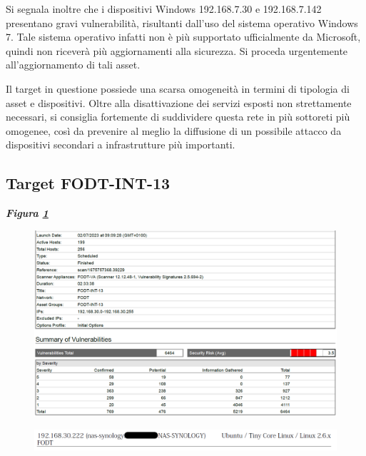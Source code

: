 \documentclass[target=bach,aauheader=]{thud}
\begin{document}
Si segnala inoltre che i dispositivi Windows 192.168.7.30 e 192.168.7.142 presentano gravi vulnerabilità, risultanti dall’uso del sistema operativo Windows 7. Tale sistema operativo infatti non è più supportato ufficialmente da Microsoft, quindi non riceverà più aggiornamenti alla sicurezza. Si proceda urgentemente all’aggiornamento di tali asset.

Il target in questione possiede una scarsa omogeneità in termini di tipologia di asset e dispositivi. Oltre alla disattivazione dei servizi esposti non strettamente necessari, si consiglia fortemente di suddividere questa rete in più sottoreti più omogenee, così da prevenire al meglio la diffusione di un possibile attacco da dispositivi secondari a infrastrutture più importanti.

\subsection{Target FODT-INT-13} \label{fodt-int-13} \textbf{\textit{Figura \ref{fig:fodt-int-13_1}}}


\begin{figure}[t]
    \centering
    \includegraphics[width=1\linewidth]{images/FODT-INT-13_1.png}
    \caption{}
    \label{fig:fodt-int-13_1}
\end{figure}

\begin{figure}[t]
    \centering
    \includegraphics[width=1\linewidth]{images/FODT-INT-13_2.png}
    \caption{}
    \label{fig:fodt-int-13_2}
\end{figure}
\end{document}
